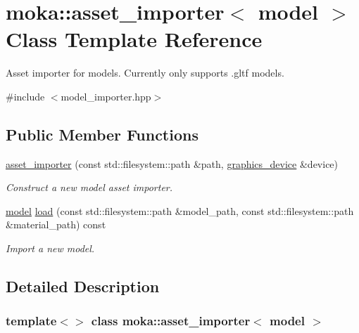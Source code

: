 \hypertarget{classmoka_1_1asset__importer_3_01model_01_4}{}\section{moka\+::asset\+\_\+importer$<$ model $>$ Class Template Reference}
\label{classmoka_1_1asset__importer_3_01model_01_4}


Asset importer for models. Currently only supports .gltf models.  




{\ttfamily \#include $<$model\+\_\+importer.\+hpp$>$}

\subsection*{Public Member Functions}
\begin{DoxyCompactItemize}
\item 
\mbox{\hyperlink{classmoka_1_1asset__importer_3_01model_01_4_ac82a2e9a4daea64ba18411e7ed43c1a4}{asset\+\_\+importer}} (const std\+::filesystem\+::path \&path, \mbox{\hyperlink{classmoka_1_1graphics__device}{graphics\+\_\+device}} \&device)
\begin{DoxyCompactList}\small\item\em Construct a new model asset importer. \end{DoxyCompactList}\item 
\mbox{\hyperlink{classmoka_1_1model}{model}} \mbox{\hyperlink{classmoka_1_1asset__importer_3_01model_01_4_a6995490f470bc1482db156bc1b8d75fb}{load}} (const std\+::filesystem\+::path \&model\+\_\+path, const std\+::filesystem\+::path \&material\+\_\+path) const
\begin{DoxyCompactList}\small\item\em Import a new model. \end{DoxyCompactList}\end{DoxyCompactItemize}


\subsection{Detailed Description}
\subsubsection*{template$<$$>$\newline
class moka\+::asset\+\_\+importer$<$ model $>$}

